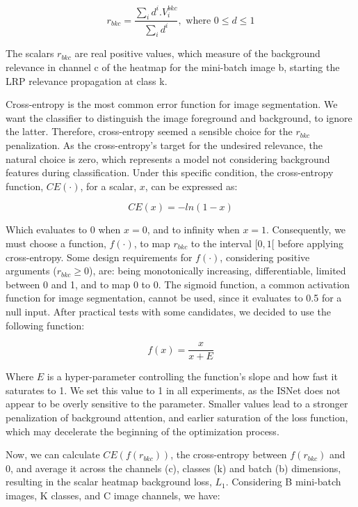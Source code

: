 \documentclass[fleqn,10pt]{wlscirep}
\begin{document}
{\begin{equation}
r_{bkc}=\frac{\sum_{i}d^{i}.V_{i}^{bkc}}{\sum_{i}d^{i}}, \mbox{ where } 0 \le d \le 1
\end{equation}

The scalars $r_{bkc}$ are real positive values, which measure of the background relevance in channel c of the heatmap for the mini-batch image b, starting the LRP relevance propagation at class k.

Cross-entropy is the most common error function for image segmentation. We want the classifier to distinguish the image foreground and background, to ignore the latter. Therefore, cross-entropy seemed a sensible choice for the $r_{bkc}$ penalization. As the cross-entropy's target for the undesired relevance, the natural choice is zero, which represents a model not considering background features during classification. Under this specific condition, the cross-entropy function, $CE(\cdot)$, for a scalar, $x$, can be expressed as:

\begin{equation}
CE(x)=-ln(1-x)
\end{equation}

Which evaluates to 0 when $x=0$, and to infinity when $x=1$. Consequently, we must choose a function, $f(\cdot)$, to map $r_{bkc}$ to the interval $[0,1[$ before applying cross-entropy. Some design requirements for $f(\cdot)$, considering positive arguments ($r_{bkc}\geq 0$), are: being monotonically increasing, differentiable, limited between 0 and 1, and to map 0 to 0. The sigmoid function, a common activation function for image segmentation, cannot be used, since it evaluates to 0.5 for a null input. After practical tests with some candidates, we decided to use the following function:

\begin{equation}
f(x)=\frac{x}{x+E}
\end{equation}

Where $E$ is a hyper-parameter controlling the function's slope and how fast it saturates to 1. We set this value to 1 in all experiments, as the ISNet does not appear to be overly sensitive to the parameter. Smaller values lead to a stronger penalization of background attention, and earlier saturation of the loss function, which may decelerate the beginning of the optimization process.

Now, we can calculate $CE(f(r_{bkc}))$, the cross-entropy between $f(r_{bkc})$ and 0, and average it across the channels (c), classes (k) and batch (b) dimensions, resulting in the scalar heatmap background loss, $L_{1}$. Considering B mini-batch images, K classes, and C image channels, we have:

}
\end{document}
